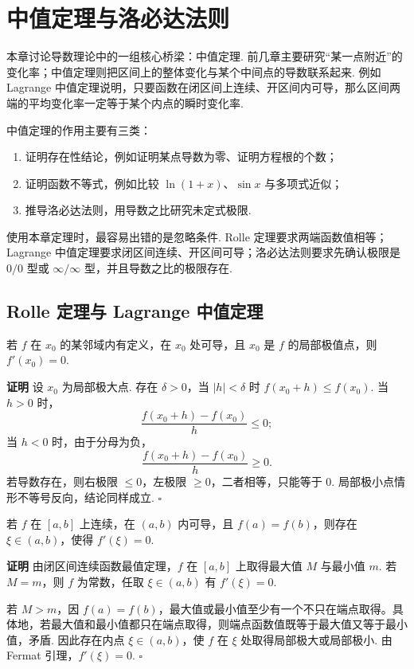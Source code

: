 \documentclass[fontset=fandol]{ctexart}
\newcounter{DefinitionCounter}[section]
\newcounter{TheoremCounter}[section]
\newcounter{PropositionCounter}[section]
\newcounter{ExampleCounter}[section]
\newcounter{ExerciseCounter}[section]
\newenvironment{proofdetail}{\par\noindent\textbf{证明}\quad}{\hfill$\square$\par\vspace{0.8em}}
\newcommand{\renewEnvironmentCounter}{\setcounter{DefinitionCounter}{0}\setcounter{TheoremCounter}{0}\setcounter{PropositionCounter}{0}\setcounter{ExampleCounter}{0}\setcounter{ExerciseCounter}{0}}
\begin{document}
\section{中值定理与洛必达法则}
\renewEnvironmentCounter

本章讨论导数理论中的一组核心桥梁：中值定理. 前几章主要研究“某一点附近”的变化率；中值定理则把区间上的整体变化与某个中间点的导数联系起来. 例如 Lagrange 中值定理说明，只要函数在闭区间上连续、开区间内可导，那么区间两端的平均变化率一定等于某个内点的瞬时变化率.

中值定理的作用主要有三类：
\begin{enumerate}[label=(\arabic*),leftmargin=2em]
\item 证明存在性结论，例如证明某点导数为零、证明方程根的个数；
\item 证明函数不等式，例如比较 $\ln(1+x)$、$\sin x$ 与多项式近似；
\item 推导洛必达法则，用导数之比研究未定式极限.
\end{enumerate}

使用本章定理时，最容易出错的是忽略条件. Rolle 定理要求两端函数值相等；Lagrange 中值定理要求闭区间连续、开区间可导；洛必达法则要求先确认极限是 $0/0$ 型或 $\infty/\infty$ 型，并且导数之比的极限存在.

\subsection{Rolle 定理与 Lagrange 中值定理}

\begin{theorem}[Fermat 引理]
若 $f$ 在 $x_0$ 的某邻域内有定义，在 $x_0$ 处可导，且 $x_0$ 是 $f$ 的局部极值点，则 $f'(x_0)=0$.
\end{theorem}
\begin{proofdetail}
设 $x_0$ 为局部极大点. 存在 $\delta>0$，当 $|h|<\delta$ 时 $f(x_0+h)\leq f(x_0)$. 当 $h>0$ 时，
\[
\frac{f(x_0+h)-f(x_0)}{h}\leq0;
\]
当 $h<0$ 时，由于分母为负，
\[
\frac{f(x_0+h)-f(x_0)}{h}\geq0.
\]
若导数存在，则右极限 $\leq0$，左极限 $\geq0$，二者相等，只能等于 $0$. 局部极小点情形不等号反向，结论同样成立.
\end{proofdetail}

\begin{theorem}[Rolle 定理]
若 $f$ 在 $[a,b]$ 上连续，在 $(a,b)$ 内可导，且 $f(a)=f(b)$，则存在 $\xi\in(a,b)$，使得 $f'(\xi)=0$.
\end{theorem}
\begin{proofdetail}
由闭区间连续函数最值定理，$f$ 在 $[a,b]$ 上取得最大值 $M$ 与最小值 $m$. 若 $M=m$，则 $f$ 为常数，任取 $\xi\in(a,b)$ 有 $f'(\xi)=0$.

若 $M>m$，因 $f(a)=f(b)$，最大值或最小值至少有一个不只在端点取得。具体地，若最大值和最小值都只在端点取得，则端点函数值既等于最大值又等于最小值，矛盾. 因此存在内点 $\xi\in(a,b)$，使 $f$ 在 $\xi$ 处取得局部极大或局部极小. 由 Fermat 引理，$f'(\xi)=0$.
\end{proofdetail}
\end{document}
